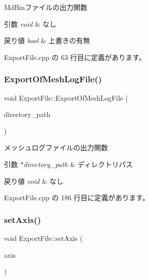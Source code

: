 Md\+Binファイルの出力関数 


\begin{DoxyParams}{引数}
{\em void} & なし \\
\hline
\end{DoxyParams}

\begin{DoxyRetVals}{戻り値}
{\em bool} & 上書きの有無 \\
\hline
\end{DoxyRetVals}


 Export\+File.\+cpp の 63 行目に定義があります。

\mbox{\label{class_export_file_a4469089d40e6b28e1468f100cb2edb9d}} 
\subsubsection{\texorpdfstring{Export\+Of\+Mesh\+Log\+File()}{ExportOfMeshLogFile()}}
{\footnotesize\ttfamily void Export\+File\+::\+Export\+Of\+Mesh\+Log\+File (\begin{DoxyParamCaption}\item[{std\+::string $\ast$}]{directory\+\_\+path }\end{DoxyParamCaption})\hspace{0.3cm}{\ttfamily [private]}}



メッシュログファイルの出力関数 


\begin{DoxyParams}{引数}
{\em $\ast$directory\+\_\+path} & ディレクトリパス \\
\hline
\end{DoxyParams}

\begin{DoxyRetVals}{戻り値}
{\em void} & なし \\
\hline
\end{DoxyRetVals}


 Export\+File.\+cpp の 186 行目に定義があります。

\mbox{\label{class_export_file_a9dd6b27de162bee08b51eb2ae62d8e17}} 
\subsubsection{\texorpdfstring{set\+Axis()}{setAxis()}}
{\footnotesize\ttfamily void Export\+File\+::set\+Axis (\begin{DoxyParamCaption}\item[{Fbx\+Axis\+System}]{axis }\end{DoxyParamCaption})}



